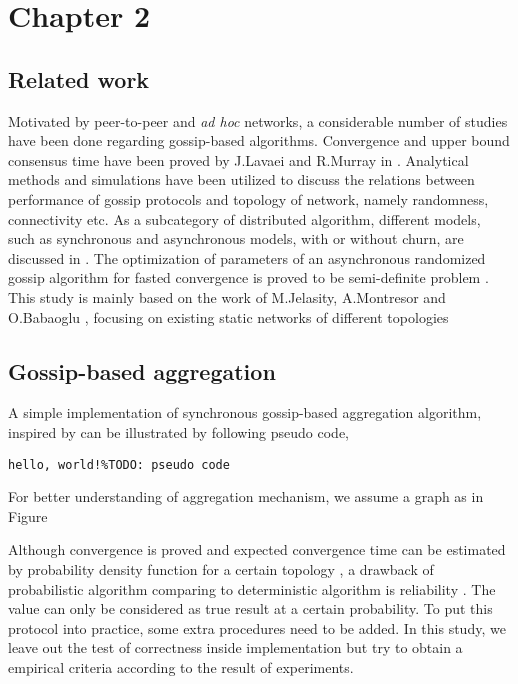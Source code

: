\documentclass[11pt,a4paper]{article}
\begin{document}
\newpage

\section{Chapter 2}
\subsection{Related work}
Motivated by peer-to-peer and {\it ad hoc} networks, a considerable number of studies have been done regarding gossip-based algorithms. Convergence and upper bound consensus time have been proved by J.Lavaei and R.Murray in \cite{5929538}. Analytical methods and simulations have been utilized to discuss the relations between performance of gossip protocols and topology of network, namely randomness, connectivity etc. As a subcategory of distributed algorithm, different models, such as synchronous and asynchronous models, with or without churn, are discussed in \cite{Lynch:1996:DA:525656}. The optimization of parameters of an asynchronous randomized gossip algorithm for fasted convergence is proved to be semi-definite problem \cite{Boyd2004}.\\
This study is mainly based on the work of M.Jelasity, A.Montresor and O.Babaoglu \cite{jelasity_gossip-based_2005}, focusing on existing static networks of different topologies \cite{knight_internet_2011}

\subsection{Gossip-based aggregation}
A simple implementation of synchronous gossip-based aggregation algorithm, inspired by \cite{jelasity_gossip-based_2005} can be illustrated by following pseudo code,
\begin{verbatim}
hello, world!%TODO: pseudo code
\end{verbatim}
For better understanding of aggregation mechanism, we assume a graph as in Figure

Although convergence is proved and expected convergence time can be estimated by probability density function for a certain topology \cite{5929538}, a drawback of probabilistic algorithm comparing to deterministic algorithm is reliability \cite{Lynch:1996:DA:525656}. The value can only be considered as true result at a certain probability. To put this protocol into practice, some extra procedures need to be added. In this study, we leave out the test of correctness inside implementation but try to obtain a empirical criteria according to the result of experiments.\\
\end{document}
